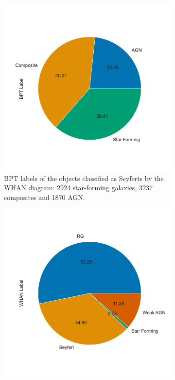 \documentclass[letterpaper, oneside]{article}
\begin{document}
	\begin{figure}[H]
		\centering
		\begin{subfigure}[b]{0.4\textwidth}
			\centering
			\includegraphics[width=\textwidth]{../WHAN_diagrams/seyferts_bpt_label_pie.pdf}
			\caption{BPT labels of the objects classified as Seyferts by the WHAN diagram: 2924 star-forming galaxies, 3237 composites and 1870 AGN.}
			\label{fig:seyferts_bpt_label_pie}
		\end{subfigure}
		\begin{subfigure}[b]{0.4\textwidth}
			\centering
			\includegraphics[width=\textwidth]{../WHAN_diagrams/agn_whan_label_pie.pdf}

\end{subfigure}
\end{figure}
\end{document}
